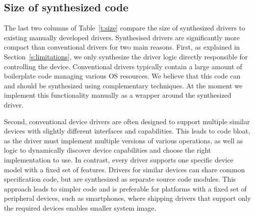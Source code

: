 
\subsection{Size of synthesized code} 
The last two columns of Table~\ref{t:size} compare the size of synthesized drivers to existing manually developed drivers.  Synthesised drivers are significantly more compact than conventional drivers for two main reasons.  First, as explained in Section~\ref{s:limitations}, we only synthesize the driver logic directly responsible for controlling the device.  Conventional drivers typically contain a large amount of boilerplate code managing various OS resources.  We believe that this code can and should be synthesized using complementary techniques.  At the moment we implement this functionality manually as a wrapper around the synthesized driver. 

Second, conventional device drivers are often designed to support multiple similar devices with slightly different interfaces and capabilities.  This leads to code bloat, as the driver must implement multiple versions of various operations, as well as logic to dynamically discover device capabilities and choose the right implementation to use.  In contrast, every \termite driver supports one specific device model with a fixed set of features.  Drivers for similar devices can share common specification code, but are synthesized as separate source code modules.  This approach leads to simpler code and is preferable for platforms with a fixed set of peripheral devices, such as smartphones, where shipping drivers that support only the required devices enables smaller system image.
  
